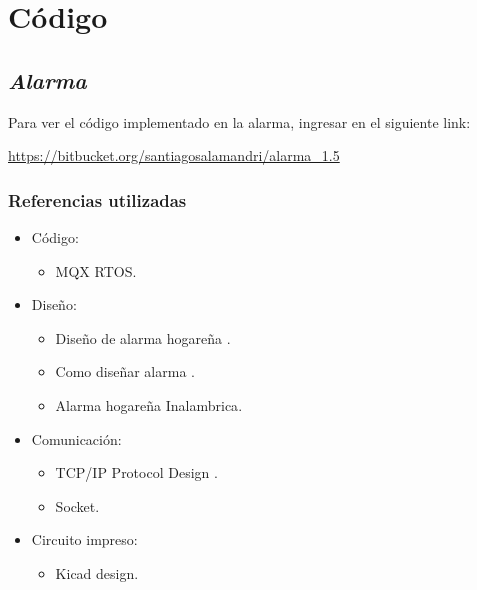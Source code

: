 
\chapter{Código} %

\label{AppendixA} %

\section{{\emph{Alarma}}}
Para ver el código implementado en la alarma, ingresar en el siguiente link:

\href{url}{https://bitbucket.org/santiagosalamandri/alarma\_1.5}

\subsection{Referencias utilizadas}
\begin{itemize}
\item Código:
	\begin{itemize}
	\item MQX RTOS\cite{embedded1}.
	\end{itemize} 
\item Diseño: 
	\begin{itemize}
	\item Diseño de alarma hogareña \cite{alarm1}.
	\item Como diseñar alarma \cite{alarm2}.
	\item Alarma hogareña Inalambrica\cite{alarm3}.
	\end{itemize}
	
\item Comunicación:
	\begin{itemize}
	\item TCP/IP Protocol Design \cite{socket1}.
	\item Socket\cite{socket9}.
	\end{itemize}
\item Circuito impreso:
	\begin{itemize}
	\item Kicad design\cite{pcb1}.
	\end{itemize}
\end{itemize}

